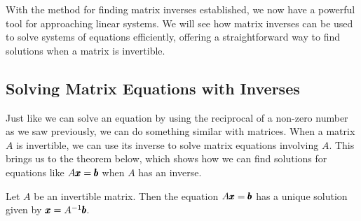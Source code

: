 With the method for finding matrix inverses established, we now have a powerful tool for approaching linear systems. We will see how matrix inverses can be used to solve systems of equations efficiently, offering a straightforward way to find solutions when a matrix is invertible.

\subsection*{Solving Matrix Equations with Inverses}
Just like we can solve an equation by using the reciprocal of a non-zero number as we saw previously, we can do something similar with matrices. When a matrix \( A \) is invertible, we can use its inverse to solve matrix equations involving \( A \). This brings us to the theorem below, which shows how we can find solutions for equations like \( A \pmb{x} = \pmb{b} \) when \( A \) has an inverse.

\begin{theorem}
    Let \( A \) be an invertible matrix. Then the equation \( A \pmb{x} = \pmb{b} \) has a unique solution given by \( \pmb{x} = A^{-1} \pmb{b} \).
\end{theorem}

